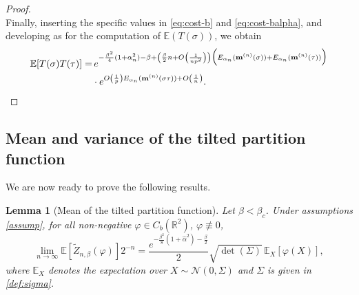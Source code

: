 \documentclass[11pt,oneside]{amsart}
\numberwithin{equation}{section}  %
\theoremstyle{plain}
\newtheorem{lemma}[theorem]{Lemma}
\theoremstyle{remark}
\def \R {{\mathbb R}}
\def \E {{\mathbb E}}
\def \bm {{\bf m}}
\begin{document}
\begin{proof}
\begin{equation*}
\end{equation*}
Finally, inserting the specific values in \eqref{eq:cost-b} and \eqref{eq:cost-balpha}, and developing as for the computation of $\E(T(\sigma))$, we obtain
\begin{equation*}
\begin{split}
\E[T(\sigma)T(\tau)] 
= &\, e^{- \frac{\beta^2}{4} (1+\alpha_n^2) -\beta
 + \left(\frac{\beta}{2}n+O\left(\frac{1}{np^2}\right)\right)
\Big( E_{\alpha_n} (\bm^{(n)}(\sigma)) +E_{\alpha_n} (\bm^{(n)}(\tau)) \Big)} \\
& \cdot e^{ O\left(\frac{1}{p}\right) E_{\alpha_n} (\bm^{(n)}(\sigma\tau))
+O\left ( \frac{1}{n} \right )}.
\end{split}
\end{equation*} 
\end{proof}



\subsection{Mean and variance of the tilted partition function}
We are now ready to prove the following results. 
\begin{lemma}[Mean of the tilted partition function]
\label{prop:meantilted} 
Let $\beta < \beta_c$. Under assumptions \eqref{assump}, for all non-negative $\varphi \in C_b(\R^2)$, $\varphi\not\equiv 0$, 
$$
\lim_{n\to\infty}\E[\widetilde{Z}_{n,\beta}(\varphi)] 2^{-n} = \frac{e^{ - \frac{\beta^2}{8} (1+\hat\alpha^2)-\frac{\beta}{2} }}{2} \sqrt{\det{(\Sigma)}} \, \E_X\left[ \varphi(X) \right], 
$$
where $\E_{X}$ denotes the expectation over $X \sim \mathcal{N}(0,\Sigma)$ and $\Sigma$ is given in \eqref{def:sigma}.
\end{lemma}
\end{document}
